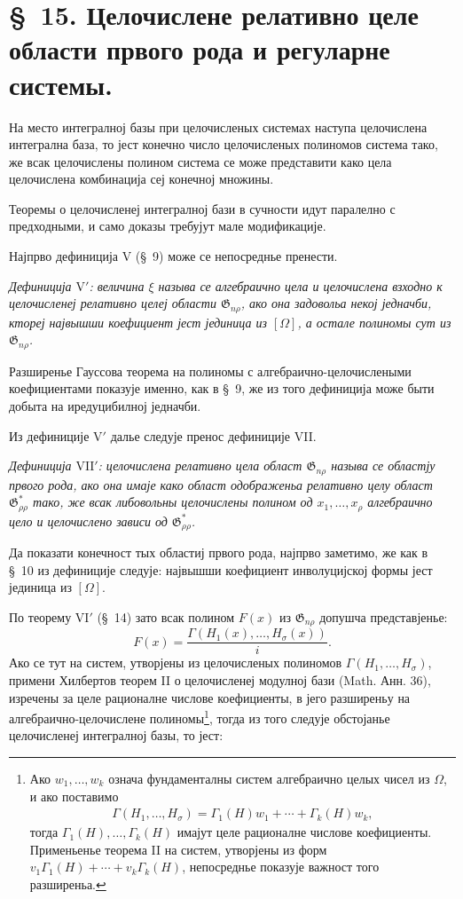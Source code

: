 ﻿\documentclass[11pt]{article}
\providecommand{\Gdom}{\mathfrak{G}}
\begin{document}
\section*{\S\ 15. Целочислене релативно целе области првого рода и регуларне системы.}

На место интегралној базы при целочисленых системах наступа целочислена интегрална база, то јест конечно число целочисленых полиномов система тако, же всак целочислены полином система се може представити како цела целочислена комбинација сеј конечној множины.

Теоремы о целочисленеј интегралној бази в сучности идут паралелно с предходными, и само доказы требујут мале модификације.

Најпрво дефиниција $\mathrm{V}$ (\S\ 9) може се непосреднье пренести.

{\itshape Дефиниција $\mathrm{V}'$: величина $\xi$ называ се алгебраично цела и целочислена взходно к целочисленеј релативно целеј области $\Gdom_{n\rho}$, ако она задовольа некој једначби, ктореј највышши коефициент јест јединица из $[\Omega]$, а остале полиномы сут из $\Gdom_{n\rho}$.}

Разширенье Гауссова теорема на полиномы с алгебраично-целочислеными коефициентами показује именно, как в \S\ 9, же из того дефиниција може быти добыта на иредуцибилној једначби.

Из дефиниције $\mathrm{V}'$ далье следује пренос дефиниције VII.

{\itshape Дефиниција $\mathrm{VII}'$: целочислена релативно цела област $\Gdom_{n\rho}$ называ се областју првого рода, ако она имаје како област одображеньа релативно целу област $\Gdom^*_{\rho\rho}$ тако, же всак либовольны целочислены полином од $x_1,\ldots,x_\rho$ алгебраично цело и целочислено зависи од $\Gdom^*_{\rho\rho}$.}

Да показати конечност тых областиј првого рода, најпрво заметимо, же как в \S\ 10 из дефиниције следује: највышши коефициент инволуцијској формы јест јединица из $[\Omega]$.

По теорему $\mathrm{VI}'$ (\S\ 14) зато всак полином $F(x)$ из $\Gdom_{n\rho}$ допушча представјенье:
\[
  F(x)=\frac{\Gamma(H_1(x),\ldots,H_\sigma(x))}{i}.
\]
Ако се тут на систем, утворјены из целочисленых полиномов $\Gamma(H_1,\ldots,H_\sigma)$, примени Хилбертов теорем II о целочисленеј модулној бази (Math. Анн. 36), изречены за целе рационалне числове коефициенты, в јего разширеньу на алгебраично-целочислене полиномы\footnote{Ако $w_1,\ldots,w_k$ означа фундаменталны систем алгебраично целых чисел из $\Omega$, и ако поставимо
\[
\begin{gathered}
  \Gamma(H_1,\ldots,H_\sigma)
  =\Gamma_1(H)w_1+\cdots+\Gamma_k(H)w_k,
\end{gathered}
\]
тогда $\Gamma_1(H),\ldots,\Gamma_k(H)$ имајут целе рационалне числове коефициенты. Применьенье теорема II на систем, утворјены из форм $v_1\Gamma_1(H)+\cdots+v_k\Gamma_k(H)$, непосреднье показује важност того разширеньа.}, тогда из того следује обстојанье целочисленеј интегралној базы, то јест:
\end{document}

